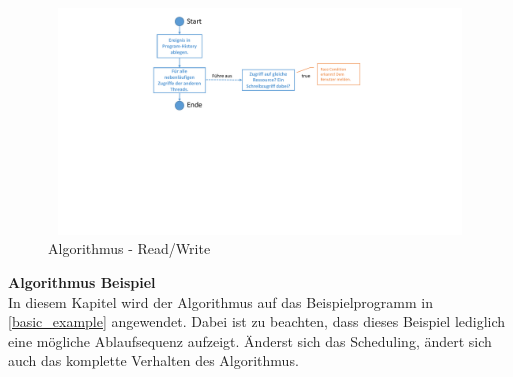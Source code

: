 \documentclass[10pt,a4paper]{article}
\begin{document}
\begin{figure}[H]
\centering
	\includegraphics[width=14cm,height=6cm,trim=70mm 100mm 80mm 7mm, clip]{images/ReadWrite.pdf}
\caption{Algorithmus - Read/Write}\label{algo_readwrite}
\end{figure}
\textbf{Algorithmus Beispiel}\\[0.3cm]
In diesem Kapitel wird der Algorithmus auf das Beispielprogramm  in \autoref{basic_example} angewendet. Dabei ist zu beachten, dass dieses Beispiel lediglich eine mögliche Ablaufsequenz aufzeigt. Änderst sich das Scheduling, ändert sich auch das komplette Verhalten des Algorithmus.\\
\end{document}

